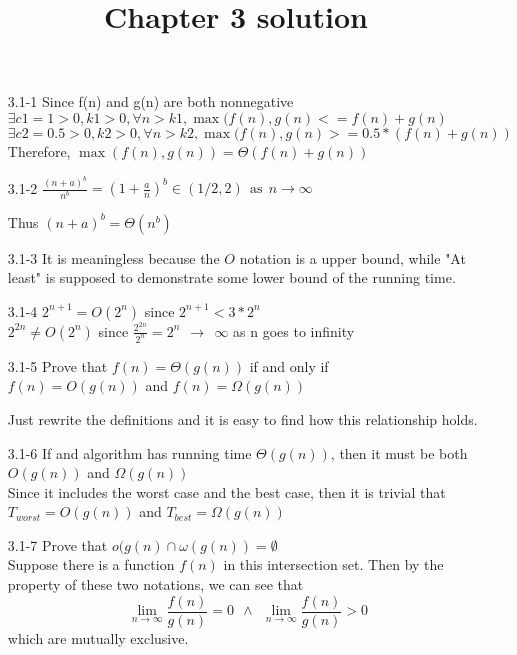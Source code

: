 \documentclass[]{article}
\title{}
\author{}
\begin{document}
\title{Chapter 3 solution}
\maketitle
\begin{enumerate}
\item[3.1-1] Since f(n) and g(n) are both nonnegative\\
$ \exists c1=1>0, k1>0, \forall n>k1, \max(f(n),g(n)<=f(n)+g(n) $\\
$ \exists c2=0.5>0, k2>0, \forall n>k2, \max(f(n),g(n)>=0.5*(f(n)+g(n)) $\\
Therefore, $ \max(f(n),g(n)) = \Theta(f(n)+g(n)) $

\item[3.1-2] $ \frac{(n+a)^b}{n^b} = (1+\frac{a}{n})^b \in (1/2, 2)\ \  \text{as}\ \  n \to \infty$

Thus $(n+a)^b = \Theta(n^b)$

\item[3.1-3] It is meaningless because the $O$ notation is a upper bound, while "At least" is supposed to demonstrate some lower bound of the running time.

\item[3.1-4] $2^{n+1} = O(2^n)$ since $2^{n+1} < 3*2^{n}$\\
$2^{2n} \neq O(2^n)$ since $\frac{2^{2n}}{2^n} = 2^n \ \ \to \ \ \infty$ as n goes to infinity

\item[3.1-5] Prove that $f(n) = \Theta(g(n))$ if and only if\\ $f(n) = O(g(n))$ and $ f(n) = \Omega(g(n)) $

Just rewrite the definitions and it is easy to find how this relationship holds.

\item[3.1-6] If and algorithm has running time $\Theta(g(n))$, then it must be both $O(g(n))$ and $\Omega(g(n))$\\
Since it includes the worst case and the best case, then it is trivial that $ T_{worst} = O(g(n)) $ and $T_{best} = \Omega(g(n))$

\item[3.1-7] Prove that $o(g(n) \cap \omega(g(n)) = \emptyset $\\
Suppose there is a function $f(n)$ in this intersection set. Then by the property of these two notations, we can see that $$ \lim\limits_{n\to \infty} \frac{f(n)}{g(n)} = 0\ \  \wedge  \ \ \lim\limits_{n\to \infty}\frac{f(n)}{g(n)} > 0 $$
which are mutually exclusive. 


\end{enumerate}
\end{document}
